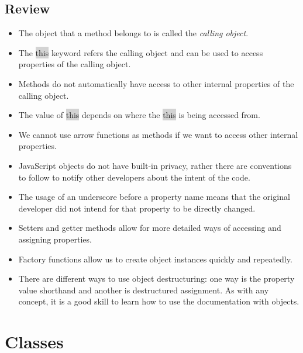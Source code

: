 \documentclass[11pt]{article}
\begin{document}
\subsection{Review}
\begin{itemize}[leftmargin = *]
\item The object that a method belongs to is called the \textit{calling object}.
\item The \colorbox{lightgray}{this} keyword refers the calling object and can be used to access properties of the calling object.
\item Methods do not automatically have access to other internal properties of the calling object.
\item The value of \colorbox{lightgray}{this} depends on where the \colorbox{lightgray}{this} is being accessed from.
\item We cannot use arrow functions as methods if we want to access other internal properties.
\item JavaScript objects do not have built-in privacy, rather there are conventions to follow to notify other developers about the intent of the code.
\item The usage of an underscore before a property name means that the original developer did not intend for that property to be directly changed.
\item Setters and getter methods allow for more detailed ways of accessing and assigning properties.
\item Factory functions allow us to create object instances quickly and repeatedly.
\item There are different ways to use object destructuring: one way is the property value shorthand and another is destructured assignment.
As with any concept, it is a good skill to learn how to use the documentation with objects.
\end{itemize}

\newpage
\section{Classes}
\end{document}
